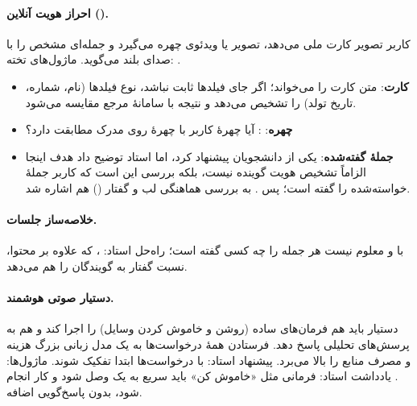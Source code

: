 \paragraph{احراز هویت آنلاین ().} کاربر تصویر کارت ملی می‌دهد، تصویر یا ویدئوی چهره می‌گیرد و جمله‌ای مشخص را با صدای بلند می‌گوید. ماژول‌های تخته: .
\begin{itemize}
  \item \textbf{کارت}:  متن کارت را می‌خواند؛ اگر جای فیلدها ثابت نباشد،  نوع فیلدها (نام، شماره، تاریخ تولد) را تشخیص می‌دهد و نتیجه با سامانهٔ مرجع مقایسه می‌شود.
  \item \textbf{چهره}: : آیا چهرهٔ کاربر با چهرهٔ روی مدرک مطابقت دارد؟
  \item \textbf{جملهٔ گفته‌شده}: یکی از دانشجویان  پیشنهاد کرد، اما استاد توضیح داد هدف اینجا الزاماً تشخیص هویت گوینده نیست، بلکه بررسی این است که کاربر جملهٔ خواسته‌شده را گفته است؛ پس . به بررسی هماهنگی لب و گفتار () هم اشاره شد.
\end{itemize}

\paragraph{خلاصه‌ساز جلسات.} با  و  معلوم نیست هر جمله را چه کسی گفته است؛ راه‌حل استاد: ، که علاوه بر محتوا، نسبت گفتار به گویندگان را هم می‌دهد.

\paragraph{دستیار صوتی هوشمند.} دستیار باید هم فرمان‌های ساده (روشن و خاموش کردن وسایل) را اجرا کند و هم به پرسش‌های تحلیلی پاسخ دهد. فرستادن همهٔ درخواست‌ها به یک مدل زبانی بزرگ هزینه و مصرف منابع را بالا می‌برد. پیشنهاد استاد: با  درخواست‌ها ابتدا تفکیک شوند. ماژول‌ها: . یادداشت استاد: فرمانی مثل «خاموش کن» باید سریع به یک  وصل شود و کار انجام شود، بدون پاسخ‌گویی اضافه.

